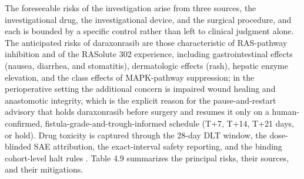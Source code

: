 The foreseeable risks of the investigation arise from three sources, the
investigational drug, the investigational device, and the surgical procedure, and
each is bounded by a specific control rather than left to clinical judgment alone.
The anticipated risks of daraxonrasib are those characteristic of RAS-pathway
inhibition and of the RASolute 302 experience, including gastrointestinal effects
(nausea, diarrhea, and stomatitis), dermatologic effects (rash), hepatic enzyme
elevation, and the class effects of MAPK-pathway suppression; in the perioperative
setting the additional concern is impaired wound healing and anastomotic integrity,
which is the explicit reason for the pause-and-restart advisory that holds
daraxonrasib before surgery and resumes it only on a human-confirmed,
fistula-grade-and-trough-informed schedule (T+7, T+14, T+21 days, or hold). Drug
toxicity is captured through the 28-day DLT window, the dose-blinded SAE attribution,
the exact-interval safety reporting, and the binding cohort-level halt rules
\cite{daraxwhipple,oncotrialllm}. Table 4.9 summarizes the principal risks, their
sources, and their mitigations.

